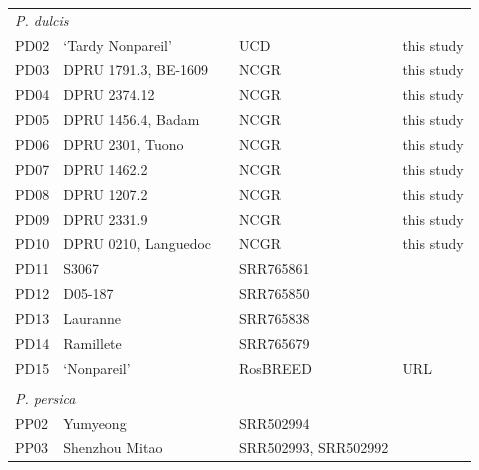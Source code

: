 \documentclass[12pt]{article}
\begin{document}
\begin{center}
\begin{longtable}{lllll}
                 \multicolumn{5}{l}{\em{P. dulcis}}  \\
                 PD02 &‘Tardy Nonpareil’ & &UCD &this study\\ %
                 PD03 &DPRU 1791.3, BE-1609 & &NCGR &this study\\ %
                 PD04 &DPRU 2374.12 & &NCGR &this study\\ %
                 PD05 &DPRU 1456.4, Badam & &NCGR &this study\\ %
                 PD06 &DPRU 2301, Tuono & &NCGR &this study\\ %
                 PD07 &DPRU 1462.2 & &NCGR &this study\\ %
                 PD08 &DPRU 1207.2 & &NCGR &this study\\ %
                 PD09 &DPRU 2331.9 & &NCGR &this study\\ %
                 PD10 &DPRU 0210, Languedoc & &NCGR &this study\\ %
                 PD11 &S3067 & &SRR765861 &\citep{koepke2013comparative}\\
                 PD12 &D05-187 & &SRR765850 &\citep{koepke2013comparative}\\
                 PD13 &Lauranne & &SRR765838 &\citep{koepke2013comparative}\\
                 PD14 &Ramillete & &SRR765679 &\citep{koepke2013comparative}\\
                 PD{\color{red}15} &‘Nonpareil’ & &RosBREED &URL \\
                 \\
                 \multicolumn{5}{l}{\em{P. persica}}  \\ %
                 PP02 &Yumyeong & &SRR502994 &\citep{verde2013high}\\
                 PP03 &Shenzhou Mitao& &\multirow{2}{1cm}{SRR502993, SRR502992} &\citep{verde2013high}\\

\end{longtable}
\end{center}
\end{document}
